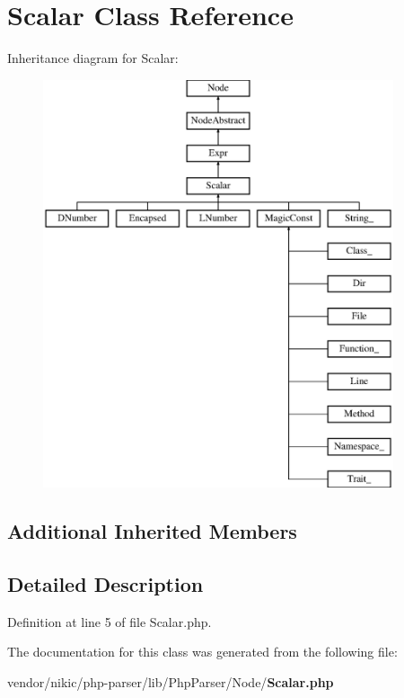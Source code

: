 \section{Scalar Class Reference}
\label{class_php_parser_1_1_node_1_1_scalar}
Inheritance diagram for Scalar\+:\begin{figure}[H]
\begin{center}
\leavevmode
\includegraphics[height=12.000000cm]{class_php_parser_1_1_node_1_1_scalar}
\end{center}
\end{figure}
\subsection*{Additional Inherited Members}


\subsection{Detailed Description}


Definition at line 5 of file Scalar.\+php.



The documentation for this class was generated from the following file\+:\begin{DoxyCompactItemize}
\item 
vendor/nikic/php-\/parser/lib/\+Php\+Parser/\+Node/{\bf Scalar.\+php}\end{DoxyCompactItemize}
